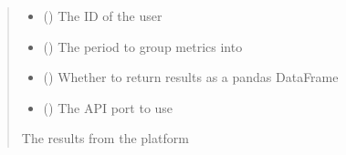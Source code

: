 \documentclass[letterpaper,10pt,english]{sphinxmanual}
\begin{document}
\begin{fulllineitems}
\begin{fulllineitems}
\begin{sphinxVerbatim}[commandchars=\\\{\}]
 
  
\end{sphinxVerbatim}
\begin{quote}\begin{description}
\begin{itemize}
\item {} 
\sphinxAtStartPar
{} () \textendash{} The ID of the user

\item {} 
\sphinxAtStartPar
{} (\sphinxstyleliteralemphasis{\sphinxupquote{ (}}\sphinxstyleliteralemphasis{\sphinxupquote{)}}) \textendash{} The period to group metrics into

\item {} 
\sphinxAtStartPar
{} (\sphinxstyleliteralemphasis{\sphinxupquote{ (}}\sphinxstyleliteralemphasis{\sphinxupquote{)}}) \textendash{} Whether to return results as a pandas DataFrame

\item {} 
\sphinxAtStartPar
{} (\sphinxstyleliteralemphasis{\sphinxupquote{ (}}\sphinxstyleliteralemphasis{\sphinxupquote{)}}) \textendash{} The API port to use

\end{itemize}

\sphinxAtStartPar
{} \textendash{} The results from the platform


\end{description}
\end{quote}
\end{fulllineitems}
\end{fulllineitems}
\end{document}
